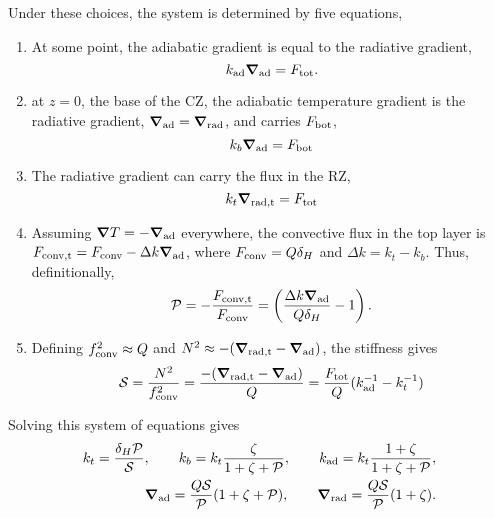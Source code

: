 \documentclass[12pt,preprint]{article}
\renewcommand{\vec}[1]{\boldsymbol{#1}}
\newcommand{\grad}{\vec{\nabla}}
\begin{document}
Under these choices, the system is determined by five equations,
\begin{enumerate}
\item At some point, the adiabatic gradient is equal to the radiative gradient,
\begin{equation}
k_{\rm{ad}}\grad_{\rm{ad}} = F_{\rm{tot}}.
\end{equation}
\item at $z = 0$, the base of the CZ, the adiabatic temperature gradient is the radiative gradient, $\grad_{\rm{ad}} = \grad_{\rm{rad}}$, and carries $F_{\rm{bot}}$,
\begin{equation}
k_b \grad_{\rm{ad}} = F_{\rm{bot}}
\end{equation}
\item The radiative gradient can carry the flux in the RZ,
\begin{equation}
k_{t} \grad_{\rm{rad,t}} = F_{\rm{tot}}
\end{equation}
\item Assuming $\grad T = -\grad_{\rm{ad}}$ everywhere, the convective flux in the top layer is $F_{\rm{conv,t}} = F_{\rm{conv}} - \Delta k \grad_{\rm{ad}}$, where $F_{\rm{conv}} = Q \delta_H$ and $\Delta k = k_t - k_b$.
Thus, definitionally,
\begin{equation}
\mathcal{P} = -\frac{F_{\rm{conv,t}}}{F_{\rm{conv}}} = \left(\frac{\Delta k \grad_{\rm{ad}}}{Q \delta_H} - 1\right).
\end{equation}
\item Defining $f_{\rm{conv}}^2 \approx Q$ and $N^2 \approx -(\grad_{\rm{rad,t}} - \grad_{\rm{ad}})$, the stiffness gives
\begin{equation}
\mathcal{S} = \frac{N^2}{f_{\mathrm{conv}}^2} = \frac{-(\grad_{\rm{rad,t}} - \grad_{\rm{ad}})}{Q}
= \frac{F_{\mathrm{tot}}}{Q}(k_{\rm{ad}}^{-1} - k_t^{-1})
\end{equation}
\end{enumerate}

Solving this system of equations gives
\begin{align}
k_t = \frac{\delta_H \mathcal{P}}{\mathcal{S}},\qquad
k_b = k_t \frac{\zeta}{1 + \zeta + \mathcal{P}},\qquad
k_{\rm{ad}} = k_t \frac{1 + \zeta}{1 + \zeta + \mathcal{P}},\\
\grad_{\rm{ad}} = \frac{Q \mathcal{S}}{\mathcal{P}}(1 + \zeta + \mathcal{P}),\qquad
\grad_{\rm{rad}} = \frac{Q \mathcal{S}}{\mathcal{P}}(1 + \zeta).
\end{align}
\end{document}
